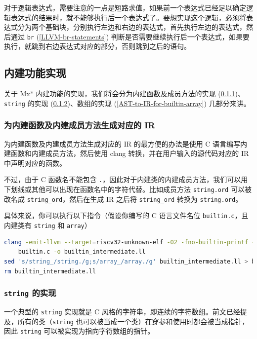 对于逻辑表达式，需要注意的一点是短路求值，如果前一个表达式已经足以确定逻辑表达式的结果时，就不能够执行后一个表达式了。要想实现这个逻辑，必须将表达式分为两个基础块，分别执行左边和右边的表达式，首先执行左边的表达式，然后通过
\texttt{br} (\ref{LLVM-br-statements})
判断是否需要继续执行后一个表达式，如果要执行，就跳到右边表达式对应的部分，否则跳到之后的语句。

\subsection{内建功能实现}\label{AST-to-IR-for-builtin}

关于 Mx* 内建功能的实现，我们将会分为内建函数及成员方法的实现
(\ref{AST-to-IR-for-builtin-func})、\texttt{string} 的实现
(\ref{AST-to-IR-for-builtin-string})、数组的实现
(\ref{AST-to-IR-for-builtin-array}) 几部分来讲。

\subsubsection{为内建函数及内建成员方法生成对应的 IR}\label{AST-to-IR-for-builtin-func}

为内建函数及内建成员方法生成对应的 IR 的最方便的办法是使用 C
语言编写内建函数和内建成员方法，然后使用 clang 转换，并在用户输入的源代码对应的 IR 中声明对应的函数。

不过，由于 C 函数名不能包含 \texttt{.}，因此对于内建类的内建成员方法，我们可以用下划线或其他可以出现在函数名中的字符代替。比如成员方法
\texttt{string.ord} 可以被改名成 \texttt{string\_ord}，然后在生成 IR 之后将
\texttt{string\_ord} 转换为 \texttt{string.ord}。

具体来说，你可以执行以下指令（假设你编写的 C 语言文件名位 \texttt{builtin.c}，且内建类有 \texttt{string} 和 \texttt{array}）
\begin{lstlisting}[language=sh]
clang -emit-llvm --target=riscv32-unknown-elf -O2 -fno-builtin-printf -fno-builtin-memcpy \
    builtin.c -o builtin_intermediate.ll
sed 's/string_/string./g;s/array_/array./g' builtin_intermediate.ll > builtin.ll
rm builtin_intermediate.ll
\end{lstlisting}

\subsubsection{\texttt{string} 的实现}\label{AST-to-IR-for-builtin-string}

一个典型的 \texttt{string} 实现就是 C 风格的字符串，即连续的字符数组。前文已经提及，所有的类（\texttt{string}
也可以被当成一个类）在穿参和使用时都会被当成指针，因此 \texttt{string}
可以被实现为指向字符数组的指针。

